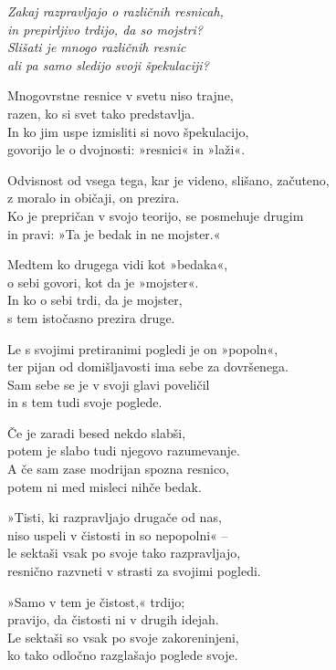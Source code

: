 \emph{Zakaj razpravljajo o različnih resnicah,\\
in prepirljivo trdijo, da so mojstri?\\
Slišati je mnogo različnih resnic\\
ali pa samo sledijo svoji špekulaciji?}

Mnogovrstne resnice v svetu niso trajne,\\
razen, ko si svet tako predstavlja.\\
In ko jim uspe izmisliti si novo špekulacijo,\\
govorijo le o dvojnosti: »resnici« in »laži«.

Odvisnost od vsega tega, kar je videno, slišano, začuteno,\\
z moralo in običaji, on prezira.\\
Ko je prepričan v svojo teorijo, se posmehuje drugim\\
in pravi: »Ta je bedak in ne mojster.«

Medtem ko drugega vidi kot »bedaka«,\\
o sebi govori, kot da je »mojster«.\\
In ko o sebi trdi, da je mojster,\\
s tem istočasno prezira druge.

Le s svojimi pretiranimi pogledi je on »popoln«,\\
ter pijan od domišljavosti ima sebe za dovršenega.\\
Sam sebe se je v svoji glavi poveličil\\
in s tem tudi svoje poglede.

Če je zaradi besed nekdo slabši,\\
potem je slabo tudi njegovo razumevanje.\\
A če sam zase modrijan spozna resnico,\\
potem ni med misleci nihče bedak.

»Tisti, ki razpravljajo drugače od nas,\\
niso uspeli v čistosti in so nepopolni« --\\
le sektaši vsak po svoje tako razpravljajo,\\
resnično razvneti v strasti za svojimi pogledi.

»Samo v tem je čistost,« trdijo;\\
pravijo, da čistosti ni v drugih idejah.\\
Le sektaši so vsak po svoje zakoreninjeni,\\
ko tako odločno razglašajo poglede svoje.

